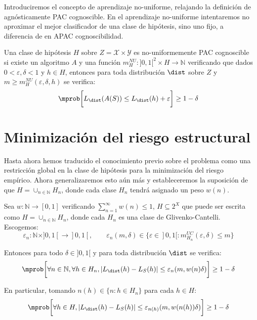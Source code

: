 Introduciremos el concepto de aprendizaje no-uniforme, relajando la definición de agnósticamente PAC cognoscible. En el 
aprendizaje no-uniforme intentaremos no aproximar el mejor clasificador de una clase de hipótesis, sino uno fijo, a diferencia
de en APAC cognoscibilidad.

\begin{definition}
Una clase de hipótesis $H$ sobre $Z=\mathcal{X} \times \mathcal{Y}$ es no-uniformemente PAC cognoscible si existe
un algoritmo $A$ y una función $m_{H}^{NU} : ]0,1[^2 \times H \rightarrow \mathbb{N}$ verificando que dados 
$0 < \varepsilon, \delta < 1$ y $h \in H$, entonces para toda distribución $\dist$ sobre $Z$ y
$m\ge m_{H}^{NU} (\varepsilon, \delta, h)$ se verifica:
\[
  \mprob\bigg[L_{\dist}(A(S)) \le L_{\dist}(h) + \varepsilon\bigg] \ge 1-\delta
\]
\end{definition}


\section{Minimización del riesgo estructural}
Hasta ahora hemos traducido el conocimiento previo sobre el problema como una restricción global en la clase de hipótesis
para la minimización del riesgo empírico. Ahora generalizaremos esto aún más y estableceremos la suposición de que 
$H= \cup_{n\in \mathbb{N}} H_n$, donde cada clase $H_n$ tendrá asignado un peso $w(n)$. 

\begin{fact}
Sea $w : \mathbb{N} \rightarrow [0,1]$ verificando $\sum_{n=1}^\infty w(n) \le 1$, $H \subseteq 2^X$
que puede ser escrita como $H= \cup_{n\in \mathbb{N}} H_n$, donde cada $H_n$ es una clase de Glivenko-Cantelli. 
Escogemos:
\[
  \varepsilon_n : \mathbb{N} \times ]0,1[ \rightarrow ]0,1[, \qquad 
  \varepsilon_n (m,\delta) \in \{\varepsilon \in ]0,1[: m_{H_n}^{UC} (\varepsilon, \delta) \le m\}
\]

Entonces para todo $\delta \in ]0,1[$ y para toda distribución $\dist$ se verifica:
\[
  \mprob\bigg[\forall n\in \mathbb{N}, \forall h\in H_n, |L_{\dist}(h) - L_S(h)| \le 
              \varepsilon_n (m, w(n) \delta)\bigg] \ge 1-\delta
\] 

En particular, tomando $n(h)\in \{n: h\in H_n\}$ para cada $h\in H$:
\[
  \mprob \bigg[\forall h\in H, |L_{\dist}(h) - L_S(h)| \le \varepsilon_{n(h)} (m, w(n(h)) \delta)\bigg] \ge 1-\delta
\]
\label{th:non-uniform-complex}
\end{fact}

